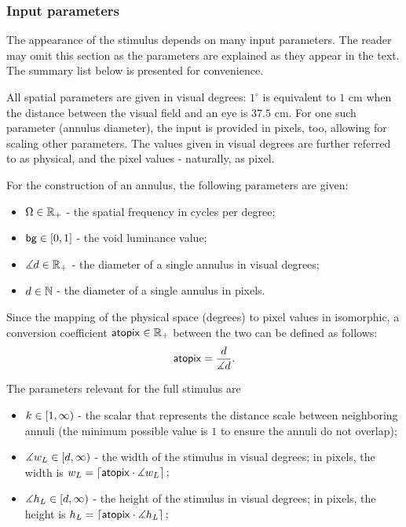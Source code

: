 \subsubsection{Input parameters}
\label{sec:stimulus-parameters}

The appearance of the stimulus depends on many input parameters.
The reader may omit this section as the parameters are explained as they appear in the text. The summary list below is presented for convenience.

All spatial parameters are given in visual degrees: $1^\circ$ is equivalent to $1$ cm when the distance between the visual field and an eye is $37.5$ cm. For one such parameter (annulus diameter), the input is provided in pixels, too, allowing for scaling other parameters. The values given in visual degrees are further referred to as physical, and the pixel values - naturally, as pixel.

For the construction of an annulus, the following parameters are given:
\begin{itemize}
    \item $\Omega \in \mathbb{R}_+$ - the spatial frequency in cycles per degree;
    
    \item $\mathsf{bg} \in [0, 1]$ - the void luminance value;
    
    \item $\measuredangle d \in \mathbb{R}_+$ - the diameter of a single annulus in visual degrees;
    
    \item $d \in \mathbb{N}$ - the diameter of a single annulus in pixels.
\end{itemize}
Since the mapping of the physical space (degrees) to pixel values in isomorphic, a conversion coefficient $\mathsf{atopix} \in \mathbb{R}_+$ between the two can be defined as follows:
\begin{equation}
    \mathsf{atopix} = \frac{d}{\measuredangle d}.
\end{equation}

The parameters relevant for the full stimulus are
\begin{itemize}
    \item $k \in [1, \infty)$ - the scalar that represents the distance scale between neighboring annuli (the minimum possible value is $1$ to ensure the annuli do not overlap);
    
    \item $\measuredangle w_L \in [d, \infty)$ - the width of the stimulus in visual degrees; in pixels, the width is
    $
        w_L = \left\lceil \mathsf{atopix} \cdot \measuredangle w_L \right\rceil;
    $
    
    \item $\measuredangle h_L \in [d, \infty)$ - the height of the stimulus in visual degrees; in pixels, the height is
    $
        h_L = \left\lceil \mathsf{atopix} \cdot \measuredangle h_L \right\rceil;
    $
\end{itemize}

